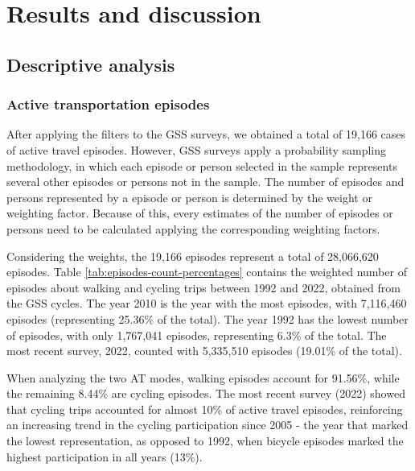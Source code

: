 \documentclass[preprint, 3p,
authoryear]{elsarticle} %
\begin{document}
\section{Results and discussion}\label{results-and-discussion}

\subsection{Descriptive analysis}\label{descriptive-analysis}

\subsubsection{Active transportation
episodes}\label{active-transportation-episodes}

After applying the filters to the GSS surveys, we obtained a total of
19,166 cases of active travel episodes. However, GSS surveys apply a
probability sampling methodology, in which each episode or person
selected in the sample represents several other episodes or persons not
in the sample. The number of episodes and persons represented by a
episode or person is determined by the weight or weighting factor.
Because of this, every estimates of the number of episodes or persons
need to be calculated applying the corresponding weighting factors.

Considering the weights, the 19,166 episodes represent a total of
28,066,620 episodes. Table \ref{tab:episodes-count-percentages} contains
the weighted number of episodes about walking and cycling trips between
1992 and 2022, obtained from the GSS cycles. The year 2010 is the year
with the most episodes, with 7,116,460 episodes (representing 25.36\% of
the total). The year 1992 has the lowest number of episodes, with only
1,767,041 episodes, representing 6.3\% of the total. The most recent
survey, 2022, counted with 5,335,510 episodes (19.01\% of the total).

When analyzing the two AT modes, walking episodes account for 91.56\%,
while the remaining 8.44\% are cycling episodes. The most recent survey
(2022) showed that cycling trips accounted for almost 10\% of active
travel episodes, reinforcing an increasing trend in the cycling
participation since 2005 - the year that marked the lowest
representation, as opposed to 1992, when bicycle episodes marked the
highest participation in all years (13\%).
\end{document}
